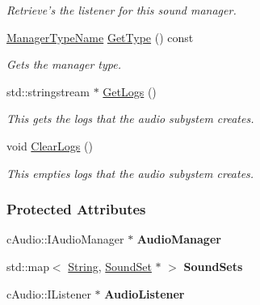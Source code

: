 \begin{DoxyCompactItemize}
\begin{DoxyCompactList}\small\item\em Retrieve's the listener for this sound manager. \item\end{DoxyCompactList}\item 
\hyperlink{classphys_1_1ManagerBase_aaa6ccddf23892eaccb898529414f80a5}{ManagerTypeName} \hyperlink{classphys_1_1SoundManager_a6815f78a6170b119e2d1d24e862ffbf8}{GetType} () const 
\begin{DoxyCompactList}\small\item\em Gets the manager type. \item\end{DoxyCompactList}\item 
std::stringstream $\ast$ \hyperlink{classphys_1_1SoundManager_a284fbc2fdbecdf66e717366b09e2c9da}{GetLogs} ()
\begin{DoxyCompactList}\small\item\em This gets the logs that the audio subystem creates. \item\end{DoxyCompactList}\item 
void \hyperlink{classphys_1_1SoundManager_acc3551bcda7b1c681d83d81cc25747ae}{ClearLogs} ()
\begin{DoxyCompactList}\small\item\em This empties logs that the audio subystem creates. \item\end{DoxyCompactList}\end{DoxyCompactItemize}
\subsubsection*{Protected Attributes}
\begin{DoxyCompactItemize}
\item 
\hypertarget{classphys_1_1SoundManager_a16bf0c35e031e2359d27c6b12536c98d}{
cAudio::IAudioManager $\ast$ {\bfseries AudioManager}}
\label{d1/dc4/classphys_1_1SoundManager_a16bf0c35e031e2359d27c6b12536c98d}

\item 
\hypertarget{classphys_1_1SoundManager_a7a8e89ec9886d28cf6331930b4269fb3}{
std::map$<$ \hyperlink{namespacephys_aa03900411993de7fbfec4789bc1d392e}{String}, \hyperlink{classphys_1_1SoundSet}{SoundSet} $\ast$ $>$ {\bfseries SoundSets}}
\label{d1/dc4/classphys_1_1SoundManager_a7a8e89ec9886d28cf6331930b4269fb3}

\item 
\hypertarget{classphys_1_1SoundManager_a5b882ae37b8fbe843eee1f865be72a51}{
cAudio::IListener $\ast$ {\bfseries AudioListener}}
\label{d1/dc4/classphys_1_1SoundManager_a5b882ae37b8fbe843eee1f865be72a51}

\end{DoxyCompactItemize}


